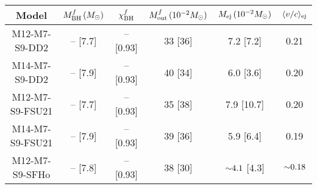 \begin{tabular}{c cc ccc}
	\toprule \toprule
	Model & $M_{\rm BH}^f\,(M_\odot)$ & $\chi_{\rm BH}^f$ & $M_{\rm out}^f\,(10^{-2} M_\odot)$ & $M_{\rm ej}\,(10^{-2} M_\odot)$ & $\langle v/c \rangle_{\rm ej}$\\
	\midrule
	M12-M7-S9-DD2 & -- [7.7] & -- [0.93] & 33 [36] & 7.2 [7.2] & 0.21\\
	M14-M7-S9-DD2 & -- [7.9] & -- [0.93] & 40 [34] & 6.0 [3.6] & 0.20\\
	M12-M7-S9-FSU21 & -- [7.7] & -- [0.93] & 35 [38] & 7.9 [10.7] & 0.20\\
	M14-M7-S9-FSU21 & -- [7.9] & -- [0.93] & 39 [36] & 5.9 [6.4] & 0.19\\
	M12-M7-S9-SFHo & -- [7.8] & -- [0.93] & 38 [30] & $\mathord{\sim} 4.1$ [4.3] & $\mathord{\sim} 0.18$\\
	\bottomrule \bottomrule
\end{tabular}
